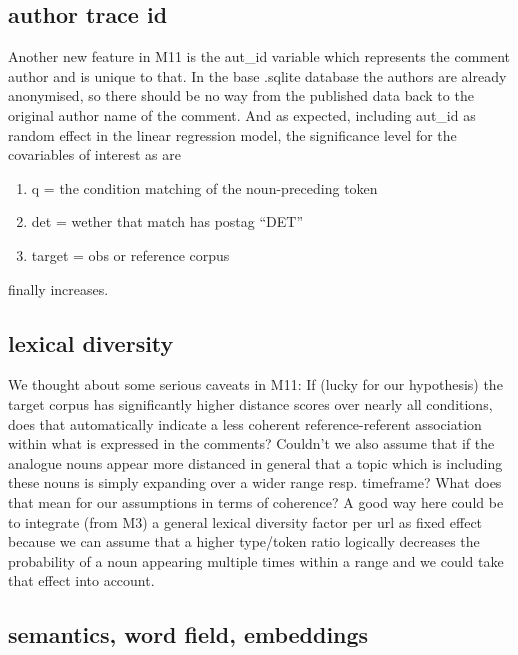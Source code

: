 \documentclass[
  12pt,
  oneside]{book}
\providecommand{\tightlist}{%
  \setlength{\itemsep}{0pt}\setlength{\parskip}{0pt}}
\begin{document}
\subsection{author trace id}\label{author-trace-id}

Another new feature in M11 is the aut\_id variable which represents the comment author and is unique to that. In the base .sqlite database the authors are already anonymised, so there should be no way from the published data back to the original author name of the comment. And as expected, including aut\_id as random effect in the linear regression model, the significance level for the covariables of interest as are

\begin{enumerate}
\def\labelenumi{\arabic{enumi}.}
\tightlist
\item
  q = the condition matching of the noun-preceding token
\item
  det = wether that match has postag ``DET''
\item
  target = obs or reference corpus
\end{enumerate}

finally increases.

\subsection{lexical diversity}\label{lexical-diversity}

We thought about some serious caveats in M11: If (lucky for our hypothesis) the target corpus has significantly higher distance scores over nearly all conditions, does that automatically indicate a less coherent reference-referent association within what is expressed in the comments? Couldn't we also assume that if the analogue nouns appear more distanced in general that a topic which is including these nouns is simply expanding over a wider range resp. timeframe? What does that mean for our assumptions in terms of coherence? A good way here could be to integrate (from M3) a general lexical diversity factor per url as fixed effect because we can assume that a higher type/token ratio logically decreases the probability of a noun appearing multiple times within a range and we could take that effect into account.

\subsection{semantics, word field, embeddings}\label{semantics-word-field-embeddings}
\end{document}
